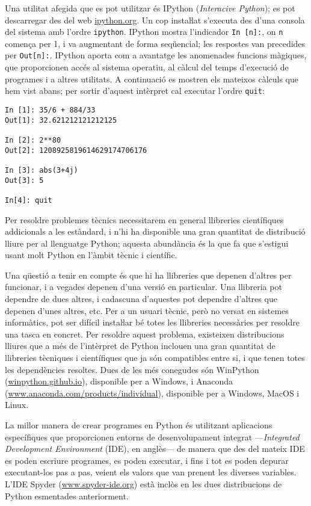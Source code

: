 Una utilitat afegida que es pot utilitzar és IPython (\textit{Interacive Python}); es pot descarregar des del web \href{https://ipython.org/}{ipython.org}. Un cop instaŀlat s'executa des d'una consola del sistema amb l'ordre \texttt{ipython}. IPython mostra l'indicador \texttt{In [n]:}, on \texttt{n} comença per 1, i va augmentant de forma seqüencial; les respostes van precedides per \texttt{Out[n]:}. IPython aporta com a avantatge les anomenades funcions màgiques, que proporcionen accés al sistema operatiu, al càlcul del temps d'execució de programes i a altres utilitats. A continuació es mostren els mateixos càlculs que hem vist abans; per sortir d'aquest intèrpret cal executar l'ordre \texttt{quit}:
\begin{lstlisting}
In [1]: 35/6 + 884/33
Out[1]: 32.621212121212125

In [2]: 2**80
Out[2]: 1208925819614629174706176

In [3]: abs(3+4j)
Out[3]: 5

In[4]: quit
\end{lstlisting}

Per resoldre problemes tècnics necessitarem en general llibreries científiques addicionals a les estàndard,  i n'hi ha disponible una gran quantitat de distribució lliure  per al llenguatge Python; aquesta abundància és la que fa que s'estigui usant molt Python en l'àmbit tècnic i científic.

Una qüestió a tenir en compte és que hi ha llibreries que depenen d'altres per funcionar, i a vegades  depenen d'una versió en particular. Una llibreria pot dependre de dues altres, i cadascuna d'aquestes pot dependre d'altres que depenen d'unes altres, etc. Per a un usuari tècnic, però no versat en sistemes informàtics, pot ser difícil instaŀlar bé totes les llibreries necessàries per resoldre una tasca en concret. Per resoldre aquest problema, existeixen distribucions lliures que a més de l'intèrpret de Python inclouen una gran quantitat de llibreries tècniques i científiques que ja són compatibles entre si, i que tenen totes les dependències resoltes. Dues de les més conegudes són WinPython (\href{https://winpython.github.io/}{winpython.github.io}), disponible  per a Windows, i
Anaconda (\href{https://www.anaconda.com/products/individual}{www.anaconda.com/products/individual}), disponible per a Windows, MacOS i Linux.



La millor manera de crear programes en Python és utilitzant aplicacions específiques que proporcionen entorns  de desenvolupament integrat ---\textit{Integrated Development Environment} (IDE), en anglès--- de manera que des del mateix IDE es poden escriure programes, es poden executar, i fins i tot es poden depurar executant-los pas a pas, veient els valors que van prenent les diverses variables. L'IDE Spyder (\href{https://www.spyder-ide.org/}{www.spyder-ide.org}) està inclòs en les dues distribucions de Python esmentades anteriorment. 

